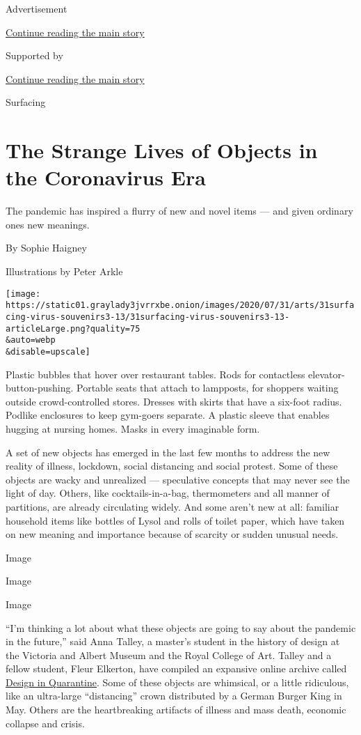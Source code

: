Advertisement

\protect\hyperlink{after-top}{Continue reading the main story}

Supported by

\protect\hyperlink{after-sponsor}{Continue reading the main story}

Surfacing

\hypertarget{the-strange-lives-of-objects-in-the-coronavirus-era}{%
\section{The Strange Lives of Objects in the Coronavirus
Era}\label{the-strange-lives-of-objects-in-the-coronavirus-era}}

The pandemic has inspired a flurry of new and novel items --- and given
ordinary ones new meanings.

By Sophie Haigney

Illustrations by Peter Arkle

\texttt{[image: https://static01.graylady3jvrrxbe.onion/images/2020/07/31/arts/31surfacing-virus-souvenirs3-13/31surfacing-virus-souvenirs3-13-articleLarge.png?quality=75\\\&auto=webp\\\&disable=upscale]}

Plastic bubbles that hover over restaurant tables. Rods for contactless
elevator-button-pushing. Portable seats that attach to lampposts, for
shoppers waiting outside crowd-controlled stores. Dresses with skirts
that have a six-foot radius. Podlike enclosures to keep gym-goers
separate. A plastic sleeve that enables hugging at nursing homes. Masks
in every imaginable form.

A set of new objects has emerged in the last few months to address the
new reality of illness, lockdown, social distancing and social protest.
Some of these objects are wacky and unrealized --- speculative concepts
that may never see the light of day. Others, like cocktails-in-a-bag,
thermometers and all manner of partitions, are already circulating
widely. And some aren't new at all: familiar household items like
bottles of Lysol and rolls of toilet paper, which have taken on new
meaning and importance because of scarcity or sudden unusual needs.

Image

Image

Image

``I'm thinking a lot about what these objects are going to say about the
pandemic in the future,'' said Anna Talley, a master's student in the
history of design at the Victoria and Albert Museum and the Royal
College of Art. Talley and a fellow student, Fleur Elkerton, have
compiled an expansive online archive called
\href{https://designinquarantine.com/}{Design in Quarantine}. Some of
these objects are whimsical, or a little ridiculous, like an ultra-large
``distancing'' crown distributed by a German Burger King in May. Others
are the heartbreaking artifacts of illness and mass death, economic
collapse and crisis.

